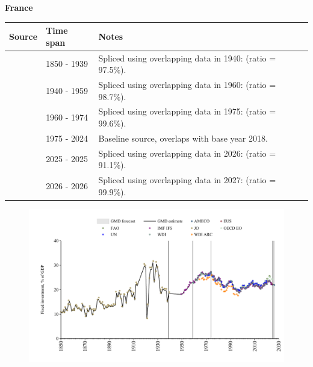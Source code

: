 \documentclass[12pt,a4paper,landscape]{article}
\begin{document}
\begin{adjustbox}{max totalsize={\paperwidth}{\paperheight},center}
\begin{minipage}[t][\textheight][t]{\textwidth}
\vspace*{0.5cm}
{}
\begin{center}
{\Large\bfseries France}
\end{center}
\vspace{0.5cm}
\begin{table}[H]
\centering
\small
\begin{tabular}{|l|l|l|}
\hline
\textbf{Source} & \textbf{Time span} & \textbf{Notes} \\
\hline
\rowcolor{white}\cite{JO}& 1850 - 1939 &Spliced using overlapping data in 1940: (ratio = 97.5\%).\\
\rowcolor{lightgray}\cite{IMF_IFS}& 1940 - 1959 &Spliced using overlapping data in 1960: (ratio = 98.7\%).\\
\rowcolor{white}\cite{WDI}& 1960 - 1974 &Spliced using overlapping data in 1975: (ratio = 99.6\%).\\
\rowcolor{lightgray}\cite{EUS}& 1975 - 2024 &Baseline source, overlaps with base year 2018.\\
\rowcolor{white}\cite{OECD_EO}& 2025 - 2025 &Spliced using overlapping data in 2026: (ratio = 91.1\%).\\
\rowcolor{lightgray}\cite{AMECO}& 2026 - 2026 &Spliced using overlapping data in 2027: (ratio = 99.9\%).\\
\hline
\end{tabular}
\end{table}
\begin{figure}[H]
\centering
\includegraphics[width=\textwidth,height=0.6\textheight,keepaspectratio]{graphs/FRA_finv_GDP.pdf}
\end{figure}
\end{minipage}
\end{adjustbox}
\end{document}
